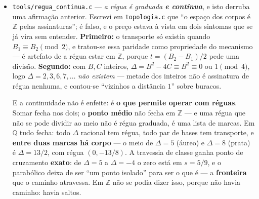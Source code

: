 \documentclass[11pt]{article}
\newcommand{\code}[1]{\texttt{\small #1}}
\newcommand{\Z}{\mathbb Z}
\newcommand{\Q}{\mathbb Q}
\theoremstyle{plain}
\theoremstyle{remark}
\begin{document}
\begin{itemize}
não negativa, simétrica e triangular; \emph{pseudo}métrica no espaço das réguas e
\textbf{métrica no quociente pelas classes} --- distância zero não quer dizer ``a mesma régua'',
quer dizer \emph{o mesmo corpo}.

E a \textbf{função de transferência} sai da mesma conta, existe e é \textbf{única}:
$\varphi_t(a,b) = (a + tb,\ b)$ com $t = (B_2-B_1)/2$ --- nenhum outro $t$ liga as duas réguas, e a
unicidade importa, porque com dois a transferência seria uma \emph{escolha}. Ela é bijetora
($\det = 1$) e preserva $\oplus$, $\otimes$ e $N$: o isomorfismo não é afirmado, é \textbf{exibido}.

E fecha mais um laço: $\varphi_t = [[1,t],[0,1]]$ é o \textbf{parabólico}, que é palavra na ISA
--- $(\code{TROCA}\ \code{GOLD})^t$. O cisalhamento era a peça que não precisava de opcode por ser
palavra de duas; vê-se agora \emph{para que serve}: é o que transporta um corpo para outro.
\textbf{A máquina muda de corpo com bytecode.}

A reta das assinaturas parte-se em três regiões --- elíptica ($\Delta<0$), o ponto parabólico
($\Delta=0$), hiperbólica ($\Delta>0$) --- com o parabólico por \textbf{fronteira}: é preciso
degenerar para mudar de lado. E a região elíptica é quase toda deserta: medindo, só \textbf{dois}
pontos têm operador de ordem $>2$, $\Delta=-4$ (Gauss, ordem $4$) e $\Delta=-3$ (Eisenstein, ordem
$6$, onde o $\Phi_3$ de ordem $3$ mora também, por $m=\pm1$ darem o mesmo $\Delta$). É a restrição
cristalográfica como \textbf{fato topológico}. (Escrevi ``três pontos'' à primeira e a contagem
corrigiu-me --- são dois.)
\item \code{tools/regua\_continua.c} --- \emph{a régua é graduada \textbf{e contínua}}, e isto
derruba uma afirmação anterior. Escrevi em \code{topologia.c} que ``o espaço dos corpos é $\Z$ pelas
assinaturas''; é falso, e o preço estava à vista em dois sintomas que se já vira sem entender.
\textbf{Primeiro:} o transporte só existia quando $B_1 \equiv B_2 \pmod 2$, e tratou-se essa
paridade como propriedade do mecanismo --- é artefato de a régua estar em $\Z$, porque
$t = (B_2-B_1)/2$ pede uma divisão. \textbf{Segundo:} com $B,C$ inteiros, $\Delta = B^2-4C \equiv
B^2 \equiv 0$ ou $1 \pmod 4$, logo $\Delta = 2,3,6,7,\dots$ \emph{não existem} --- metade dos
inteiros não é assinatura de régua nenhuma, e contou-se ``vizinhos a distância $1$'' sobre buracos.

E a continuidade não é enfeite: é \textbf{o que permite operar com réguas}. Somar fecha nos dois;
o \textbf{ponto médio} não fecha em $\Z$ --- e uma régua que não se pode dividir ao meio não é
régua graduada, é uma lista de marcas. Em $\Q$ tudo fecha: todo $\Delta$ racional tem régua, todo
par de bases tem transporte, e \textbf{entre duas marcas há corpo} --- o meio de $\Delta=5$
(áureo) e $\Delta=8$ (prata) é $\Delta=13/2$, com régua $(0,-13/8)$. A travessia de classe ganha
ponto de cruzamento \textbf{exato}: de $\Delta=5$ a $\Delta=-4$ o zero está em $s = 5/9$, e o
parabólico deixa de ser ``um ponto isolado'' para ser o que é --- a \textbf{fronteira} que o
caminho atravessa. Em $\Z$ não se podia dizer isso, porque não havia caminho: havia saltos.


\end{itemize}
\end{document}
